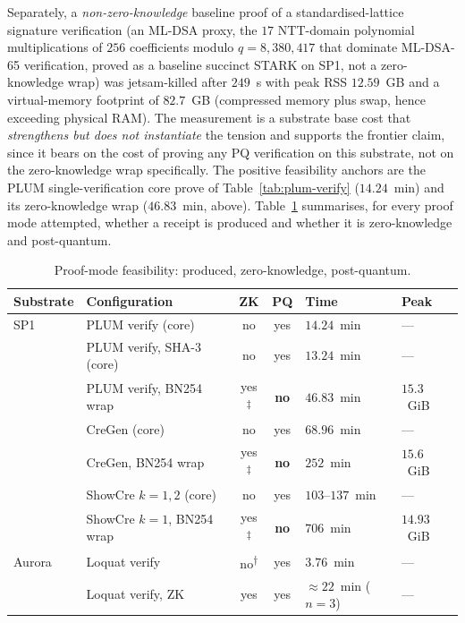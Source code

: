 Separately, a \emph{non-zero-knowledge} baseline proof of a standardised-lattice signature verification (an ML-DSA proxy, the $17$ NTT-domain polynomial multiplications of $256$ coefficients modulo $q=8{,}380{,}417$ that dominate ML-DSA-65 verification, proved as a baseline succinct STARK on SP1, not a zero-knowledge wrap) was jetsam-killed after $249$~s with peak RSS $12.59$~GB and a virtual-memory footprint of $82.7$~GB (compressed memory plus swap, hence exceeding physical RAM). The measurement is a substrate base cost that \emph{strengthens but does not instantiate} the tension and supports the frontier claim, since it bears on the cost of proving any PQ verification on this substrate, not on the zero-knowledge wrap specifically. The positive feasibility anchors are the PLUM single-verification core prove of Table~\ref{tab:plum-verify} ($14.24$~min) and its zero-knowledge wrap ($46.83$~min, above). Table~\ref{tab:proof-mode} summarises, for every proof mode attempted, whether a receipt is produced and whether it is zero-knowledge and post-quantum.

\begin{table}[H]
\centering
\small
\renewcommand{\arraystretch}{1.2}
\begin{tabular}{@{}llccll@{}}
\toprule
Substrate & Configuration & ZK & PQ & Time & Peak \\
\midrule
SP1 & PLUM verify (core) & no & yes & $14.24$~min & --- \\
 & PLUM verify, SHA-3 (core) & no & yes & $13.24$~min & --- \\
 & PLUM verify, BN254 wrap & yes\textsuperscript{$\ddagger$} & \textbf{no} & $46.83$~min & $15.3$~GiB \\
 & CreGen (core) & no & yes & $68.96$~min & --- \\
 & CreGen, BN254 wrap & yes\textsuperscript{$\ddagger$} & \textbf{no} & $252$~min & $15.6$~GiB \\
 & ShowCre $k{=}1,2$ (core) & no & yes & $103$--$137$~min & --- \\
 & ShowCre $k{=}1$, BN254 wrap & yes\textsuperscript{$\ddagger$} & \textbf{no} & $706$~min & $14.93$~GiB \\
Aurora & Loquat verify & no\textsuperscript{$\dagger$} & yes & $3.76$~min & --- \\
 & Loquat verify, ZK & yes & yes & ${\approx}22$~min ($n{=}3$) & --- \\
\bottomrule
\end{tabular}
\caption{Proof-mode feasibility: produced, zero-knowledge, post-quantum.}
\label{tab:proof-mode}
\end{table}

